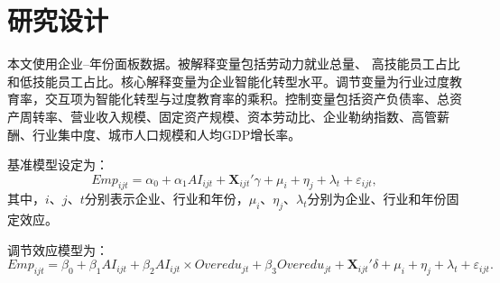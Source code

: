 \documentclass[UTF8,zihao=-4]{ctexart}
\begin{document}
\section{研究设计}
本文使用企业--年份面板数据。被解释变量包括劳动力就业总量、 高技能员工占比和低技能员工占比。核心解释变量为企业智能化转型水平。调节变量为行业过度教育率，交互项为智能化转型与过度教育率的乘积。控制变量包括资产负债率、总资产周转率、营业收入规模、固定资产规模、资本劳动比、企业勒纳指数、高管薪酬、行业集中度、城市人口规模和人均GDP增长率。

基准模型设定为：
\begin{equation}
Emp_{ijt}=\alpha_0+\alpha_1 AI_{ijt}+\mathbf{X}_{ijt}'\gamma+\mu_i+\eta_j+\lambda_t+\varepsilon_{ijt},
\end{equation}
其中，$i$、$j$、$t$分别表示企业、行业和年份，$\mu_i$、$\eta_j$、$\lambda_t$分别为企业、行业和年份固定效应。

调节效应模型为：
\begin{equation}
Emp_{ijt}=\beta_0+\beta_1 AI_{ijt}+\beta_2 AI_{ijt}\times Overedu_{jt}+\beta_3 Overedu_{jt}+\mathbf{X}_{ijt}'\delta+\mu_i+\eta_j+\lambda_t+\varepsilon_{ijt}.
\end{equation}
\end{document}
